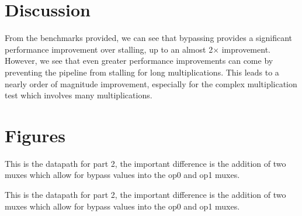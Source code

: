 \documentclass[a4paper, 12pt]{article}
\begin{document}
\section{Discussion}
From the benchmarks provided, we can see that bypassing provides a significant performance improvement over stalling, up to an almost 2$\times$ improvement. However, we see that even greater performance improvements can come by preventing the pipeline from stalling for long multiplications. This leads to a nearly order of magnitude improvement, especially for the complex multiplication test which involves many multiplications.

\section{Figures}
This is the datapath for part 2, the important difference is the addition of two muxes which allow for bypass values into the op0 and op1 muxes.


This is the datapath for part 2, the important difference is the addition of two muxes which allow for bypass values into the op0 and op1 muxes.
\end{document}
